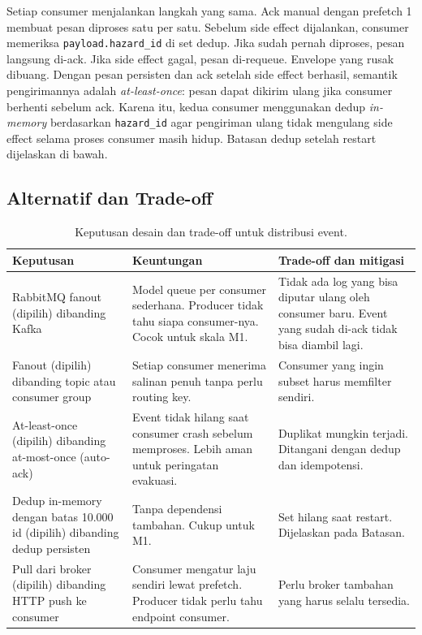 Setiap consumer menjalankan langkah yang sama. Ack manual dengan prefetch 1 membuat
pesan diproses satu per satu. Sebelum side effect dijalankan, consumer memeriksa
\texttt{payload.hazard\_id} di set dedup. Jika sudah pernah diproses, pesan langsung
di-ack. Jika side effect gagal, pesan di-requeue. Envelope yang rusak dibuang.
Dengan pesan persisten dan ack setelah side effect berhasil, semantik pengirimannya
adalah \textit{at-least-once}: pesan dapat dikirim ulang jika consumer berhenti sebelum
ack. Karena itu, kedua consumer menggunakan dedup \textit{in-memory} berdasarkan
\texttt{hazard\_id} agar pengiriman ulang tidak mengulang side effect selama proses
consumer masih hidup. Batasan dedup setelah restart dijelaskan di bawah.

\subsection{Alternatif dan Trade-off}
\begin{table}[H]
  \centering
  \small
  \begin{tabularx}{\textwidth}{p{3.2cm}XX}
    \toprule
    Keputusan & Keuntungan & Trade-off dan mitigasi \\
    \midrule
    RabbitMQ fanout (dipilih) dibanding Kafka &
    Model queue per consumer sederhana. Producer tidak tahu siapa consumer-nya. Cocok untuk skala M1. &
    Tidak ada log yang bisa diputar ulang oleh consumer baru. Event yang sudah di-ack tidak bisa diambil lagi. \\
    \addlinespace
    Fanout (dipilih) dibanding topic atau consumer group &
    Setiap consumer menerima salinan penuh tanpa perlu routing key. &
    Consumer yang ingin subset harus memfilter sendiri. \\
    \addlinespace
    At-least-once (dipilih) dibanding at-most-once (auto-ack) &
    Event tidak hilang saat consumer crash sebelum memproses. Lebih aman untuk peringatan evakuasi. &
    Duplikat mungkin terjadi. Ditangani dengan dedup dan idempotensi. \\
    \addlinespace
    Dedup in-memory dengan batas 10.000 id (dipilih) dibanding dedup persisten &
    Tanpa dependensi tambahan. Cukup untuk M1. &
    Set hilang saat restart. Dijelaskan pada Batasan. \\
    \addlinespace
    Pull dari broker (dipilih) dibanding HTTP push ke consumer &
    Consumer mengatur laju sendiri lewat prefetch. Producer tidak perlu tahu endpoint consumer. &
    Perlu broker tambahan yang harus selalu tersedia. \\
    \bottomrule
  \end{tabularx}
  \caption{Keputusan desain dan trade-off untuk distribusi event.}
  \label{tab:p5-tradeoff}
\end{table}

